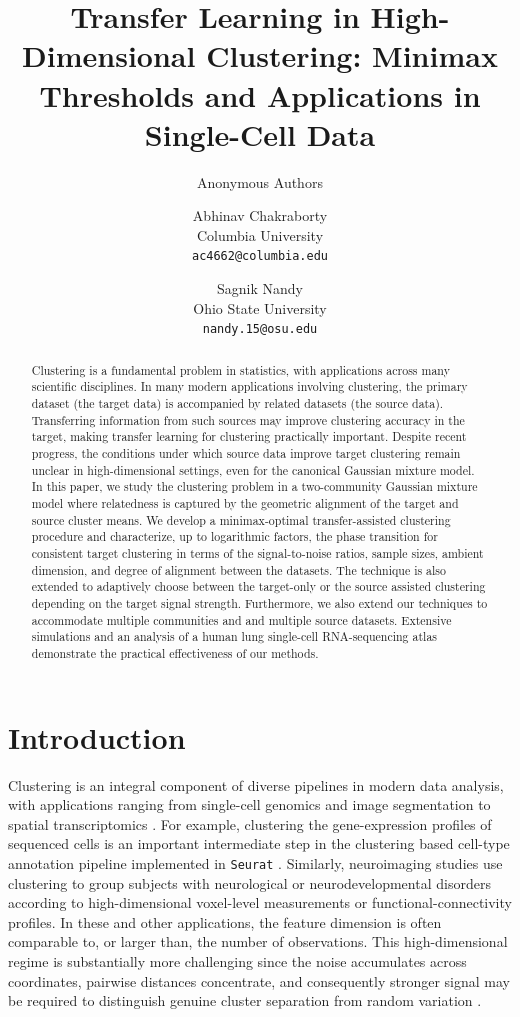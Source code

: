 \documentclass[10pt]{article}
\title{Transfer Learning in High-Dimensional Clustering: Minimax Thresholds and Applications in Single-Cell Data}
\author{Anonymous Authors}
\author{
  Abhinav Chakraborty \\
  \small Columbia University \\
  \small \texttt{ac4662@columbia.edu}
  \and
  Sagnik Nandy \\
  \small Ohio State University \\
  \small \texttt{nandy.15@osu.edu}
}
\date{}
\begin{document}
\maketitle

\begin{abstract}
Clustering is a fundamental problem in statistics, with applications across many scientific disciplines. In many modern applications involving clustering, the primary dataset (the target data) is accompanied by related datasets (the source data). Transferring information from such sources may improve clustering accuracy in the target, making transfer learning for clustering practically important. Despite recent progress, the conditions under which source data improve target clustering remain unclear in high-dimensional settings, even for the canonical Gaussian mixture model. In this paper, we study the clustering problem in a two-community Gaussian mixture model where relatedness is captured by the geometric alignment of the target and source cluster means. We develop a minimax-optimal transfer-assisted clustering procedure and characterize, up to logarithmic factors, the phase transition for consistent target clustering in terms of the signal-to-noise ratios, sample sizes, ambient dimension, and degree of alignment between the datasets.  
The technique is also extended to adaptively choose between the target-only or the source assisted clustering depending on the target signal strength. Furthermore, we also extend our techniques to accommodate multiple communities and and multiple source datasets. 
Extensive simulations and an analysis of a human lung single-cell RNA-sequencing atlas demonstrate the practical effectiveness of our methods.
\end{abstract}


\section{Introduction}

Clustering is an integral component of diverse pipelines in modern data analysis, with applications ranging from single-cell genomics \citep{Kiselev2017,Stuart2019} and image segmentation \citep{Balafar2011-vh,peng2021medical} to spatial transcriptomics \citep{zhao2021bayesspace}. For example, clustering the gene-expression profiles of sequenced cells is an important intermediate step in the clustering based cell-type annotation pipeline implemented in \texttt{Seurat} \citep{Stuart2019}. Similarly, neuroimaging studies use clustering to group subjects with neurological or neurodevelopmental disorders according to high-dimensional
voxel-level measurements or functional-connectivity profiles. In these and other applications, the feature dimension is often comparable to, or larger than, the number of observations. This high-dimensional regime is substantially more challenging since the noise accumulates across coordinates, pairwise distances concentrate, and consequently stronger signal may be required to distinguish
genuine cluster separation from random variation
\citep{CaiZhang2018,LofflerZhangZhou2021,Ndaoud2022}.
\end{document}
